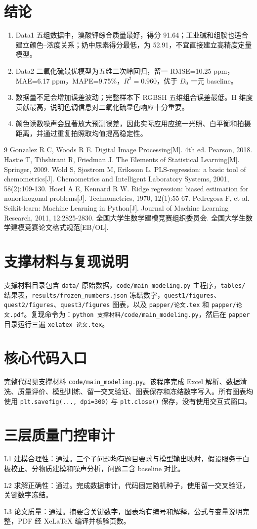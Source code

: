 \documentclass[UTF8,a4paper,12pt]{ctexart}
\begin{document}
\section{结论}
\begin{enumerate}
\item Data1 五组数据中，溴酸钾综合质量最好，得分 91.64；工业碱和组胺也适合建立颜色--浓度关系；奶中尿素得分最低，为 52.91，不宜直接建立高精度定量模型。
\item Data2 二氧化硫最优模型为五维二次岭回归，留一 RMSE=10.25 ppm，MAE=6.17 ppm，MAPE=9.75\%，$R^2=0.960$，优于 $D_0$ 一元 baseline。
\item 数据量不足会增加误差波动；完整样本下 RGBSH 五维组合误差最低。H 维度贡献最高，说明色调信息对二氧化硫显色响应十分重要。
\item 颜色读数噪声会显著放大预测误差，因此实际应用应统一光照、白平衡和拍摄距离，并通过重复拍照取均值提高稳定性。
\end{enumerate}
\begin{thebibliography}{9}
 Gonzalez R C, Woods R E. Digital Image Processing[M]. 4th ed. Pearson, 2018.
 Hastie T, Tibshirani R, Friedman J. The Elements of Statistical Learning[M]. Springer, 2009.
 Wold S, Sjostrom M, Eriksson L. PLS-regression: a basic tool of chemometrics[J]. Chemometrics and Intelligent Laboratory Systems, 2001, 58(2):109-130.
 Hoerl A E, Kennard R W. Ridge regression: biased estimation for nonorthogonal problems[J]. Technometrics, 1970, 12(1):55-67.
 Pedregosa F, et al. Scikit-learn: Machine Learning in Python[J]. Journal of Machine Learning Research, 2011, 12:2825-2830.
 全国大学生数学建模竞赛组织委员会. 全国大学生数学建模竞赛论文格式规范[EB/OL].
\end{thebibliography}
\appendix
\section{支撑材料与复现说明}
支撑材料目录包含 \texttt{data/} 原始数据，\texttt{code/main\_modeling.py} 主程序，\texttt{tables/} 结果表，\texttt{results/frozen\_numbers.json} 冻结数字，\texttt{quest1/figures}、\texttt{quest2/figures}、\texttt{quest3/figures} 图表，以及 \texttt{papper/论文.tex} 和 \texttt{papper/论文.pdf}。复现命令为：\texttt{python 支撑材料/code/main\_modeling.py}，然后在 \texttt{papper} 目录运行三遍 \texttt{xelatex 论文.tex}。
\section{核心代码入口}
完整代码见支撑材料 \texttt{code/main\_modeling.py}。该程序完成 Excel 解析、数据清洗、质量评价、模型训练、留一交叉验证、图表保存和冻结数字写入。所有图表均使用 \texttt{plt.savefig(..., dpi=300)} 与 \texttt{plt.close()} 保存，没有使用交互式窗口。
\section{三层质量门控审计}
L1 建模合理性：通过。三个子问题均有题目要求与模型输出映射，假设服务于白板校正、分物质建模和噪声分析，问题二含 baseline 对比。\par
L2 求解正确性：通过。完成数据审计，代码固定随机种子，使用留一交叉验证，关键数字冻结。\par
L3 论文质量：通过。摘要含关键数字，图表均有编号和解释，公式与变量说明完整，PDF 经 XeLaTeX 编译并核验页数。
\end{document}
